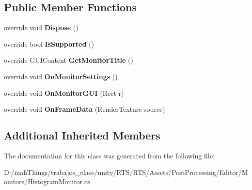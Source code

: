 \subsection*{Public Member Functions}
\begin{DoxyCompactItemize}
\item 
\mbox{\label{class_unity_editor_1_1_post_processing_1_1_histogram_monitor_a9240b5721430577251b39b7070c14ed4}} 
override void {\bfseries Dispose} ()
\item 
\mbox{\label{class_unity_editor_1_1_post_processing_1_1_histogram_monitor_a63e9ff70b84ba8443d2429359a103b02}} 
override bool {\bfseries Is\+Supported} ()
\item 
\mbox{\label{class_unity_editor_1_1_post_processing_1_1_histogram_monitor_ac727fbd3d56355c5a3b03f47ec230cb2}} 
override G\+U\+I\+Content {\bfseries Get\+Monitor\+Title} ()
\item 
\mbox{\label{class_unity_editor_1_1_post_processing_1_1_histogram_monitor_aa9ca26fe0daab044d6871dfb423bbbbf}} 
override void {\bfseries On\+Monitor\+Settings} ()
\item 
\mbox{\label{class_unity_editor_1_1_post_processing_1_1_histogram_monitor_a587ac5ca6c538b090329c9cd7dafca39}} 
override void {\bfseries On\+Monitor\+G\+UI} (Rect r)
\item 
\mbox{\label{class_unity_editor_1_1_post_processing_1_1_histogram_monitor_ae33e556cd3f2386e34562c9cda059da6}} 
override void {\bfseries On\+Frame\+Data} (Render\+Texture source)
\end{DoxyCompactItemize}
\subsection*{Additional Inherited Members}


The documentation for this class was generated from the following file\+:\begin{DoxyCompactItemize}
\item 
D\+:/mah\+Things/trabajos\+\_\+clase/unity/\+R\+T\+S/\+R\+T\+S/\+Assets/\+Post\+Processing/\+Editor/\+Monitors/Histogram\+Monitor.\+cs\end{DoxyCompactItemize}
